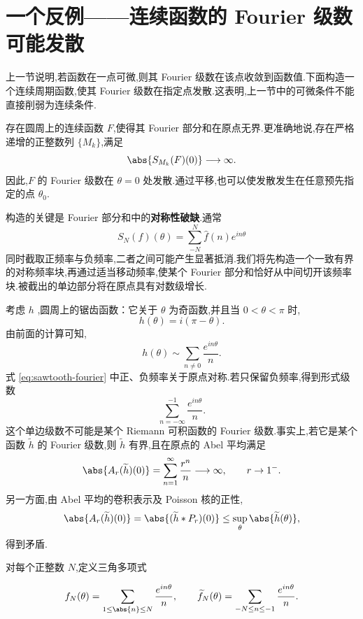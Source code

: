\section{一个反例——连续函数的 Fourier 级数可能发散}


上一节说明,若函数在一点可微,则其 Fourier 级数在该点收敛到函数值.下面构造一个连续周期函数,使其 Fourier 级数在指定点发散.这表明,上一节中的可微条件不能直接削弱为连续条件.

\begin{proposition}
	存在圆周上的连续函数 $F$,使得其 Fourier 部分和在原点无界.更准确地说,存在严格递增的正整数列 $\{M_k\}$,满足
	\[
	\abs{S_{M_k}(F)(0)}\longrightarrow\infty.
	\]
	因此,$F$ 的 Fourier 级数在 $\theta=0$ 处发散.通过平移,也可以使发散发生在任意预先指定的点 $\theta_0$.
\end{proposition}

构造的关键是 Fourier 部分和中的\textbf{对称性破缺}.通常
\[
S_N(f)(\theta)=\sum_{-N}^{N}\widehat f(n)e^{in\theta}
\]
同时截取正频率与负频率,二者之间可能产生显著抵消.我们将先构造一个一致有界的对称频率块,再通过适当移动频率,使某个 Fourier 部分和恰好从中间切开该频率块.被截出的单边部分将在原点具有对数级增长.



考虑 $h$ ,圆周上的锯齿函数：它关于 $\theta$ 为奇函数,并且当 $0<\theta<\pi$ 时,
\[
h(\theta)=i(\pi-\theta).
\]
由前面的计算可知,
\begin{equation}\label{eq:sawtooth-fourier}
	h(\theta)\sim\sum_{n\neq0}\frac{e^{in\theta}}{n}.
\end{equation}
式 \eqref{eq:sawtooth-fourier} 中正、负频率关于原点对称.若只保留负频率,得到形式级数
\[
\sum_{n=-\infty}^{-1}\frac{e^{in\theta}}{n}.
\]
这个单边级数不可能是某个 Riemann 可积函数的 Fourier 级数.事实上,若它是某个函数 $\widetilde h$ 的 Fourier 级数,则 $\widetilde h$ 有界,且在原点的 Abel 平均满足
\[
\abs{A_r(\widetilde h)(0)}
=
\sum_{n=1}^{\infty}\frac{r^n}{n}
\longrightarrow\infty,
\qquad r\to1^-.
\]
另一方面,由 Abel 平均的卷积表示及 Poisson 核的正性,
\[
\abs{A_r(\widetilde h)(0)}
=
\abs{(\widetilde h\ast P_r)(0)}
\leq
\sup_{\theta}\abs{\widetilde h(\theta)},
\]
得到矛盾.

对每个正整数 $N$,定义三角多项式

	\[ f_N(\theta)=\sum_{1\leq\abs{n}\leq N}\frac{e^{in\theta}}{n},
	\qquad
	\widetilde f_N(\theta)=\sum_{-N\leq n\leq-1}\frac{e^{in\theta}}{n}. \]

